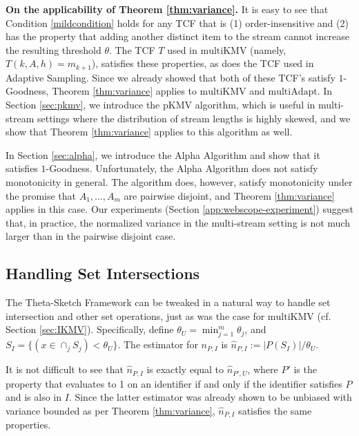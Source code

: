\documentclass{article}
\newcommand{\edit}[1]{{#1}}
\newcommand{\romTS}{\hat{n}}
\newcommand{\pIKMV}{\mathrm{pKMV}}
\newcommand{\romIAdapt}{\mathrm{multiAdapt}}
\newcommand{\romIKMV}{\mathrm{multiKMV}}
\begin{document}
\medskip
\noindent \textbf{On the applicability of Theorem \ref{thm:variance}.}
\label{sec:applicability}
It is easy to see that Condition \ref{mildcondition} holds for any TCF that is (1) order-insensitive and (2)
has the property that adding another distinct item to the stream cannot increase the resulting threshold $\theta$.
The TCF $T$ used in $\romIKMV$ (namely, $T(k,A,h) = m_{k+1}$), satisfies these properties, as does
the TCF used in Adaptive Sampling. Since we already showed that both of these TCF's satisfy $1$-Goodness, Theorem \ref{thm:variance} applies
to $\romIKMV$ and $\romIAdapt$.
In Section \ref{sec:pkmv}, we introduce the $\pIKMV$ algorithm, which is useful in multi-stream settings where the distribution of stream lengths is highly skewed, and we
show that Theorem \ref{thm:variance} applies to this algorithm as well. 



In Section \ref{sec:alpha},
we introduce the Alpha Algorithm and show that it satisfies $1$-Goodness. Unfortunately, the Alpha Algorithm 
does not satisfy monotonicity in general. 
The algorithm does, however, satisfy monotonicity under the promise that $A_1, \dots, A_m$ are pairwise disjoint, and Theorem \ref{thm:variance} applies in this case. 
Our experiments (Section \ref{app:webscope-experiment}) suggest that, in practice, the \edit{normalized} 
variance in the multi-stream setting is not much larger than in the pairwise disjoint case.
\subsection{Handling Set Intersections}\label{sec:intersections}
The Theta-Sketch Framework can be tweaked in a natural way to handle set intersection and other set operations, just as was the case
for $\romIKMV$ (cf. Section \ref{sec:IKMV}).
Specifically, define $\theta_U = \min_{j=1}^m \theta_j$, and $S_I =  \{(x \in \cap_j S_j) < \theta_U\}$.
The estimator for $n_{P, I}$ is $\romTS_{P, I} := |P(S_I)| / \theta_U$. 

It is not difficult to see that $\romTS_{P, I}$ is exactly equal to $\romTS_{P', U}$, where $P'$ is the property that evaluates to 1 on an identifier if and only if
the identifier satisfies $P$ and is also in $I$. Since the latter estimator was already shown to be unbiased with variance bounded as per Theorem \ref{thm:variance},
$\romTS_{P, I}$ satisfies the same properties. 
\end{document}
